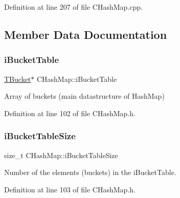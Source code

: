 Definition at line 207 of file C\+Hash\+Map.\+cpp.



\subsection{Member Data Documentation}
\mbox{\label{class_c_hash_map_a1018fdaad71e8207e747db26e88025d6}} 
\subsubsection{\texorpdfstring{i\+Bucket\+Table}{iBucketTable}}
{\footnotesize\ttfamily \hyperlink{struct_c_hash_map_1_1_t_bucket}{T\+Bucket}$\ast$ C\+Hash\+Map\+::i\+Bucket\+Table\hspace{0.3cm}{\ttfamily [private]}}



Array of buckets (main datastructure of Hash\+Map) 



Definition at line 102 of file C\+Hash\+Map.\+h.

\mbox{\label{class_c_hash_map_a8745c6aa08e235500828dea0ad30b548}} 
\subsubsection{\texorpdfstring{i\+Bucket\+Table\+Size}{iBucketTableSize}}
{\footnotesize\ttfamily size\+\_\+t C\+Hash\+Map\+::i\+Bucket\+Table\+Size\hspace{0.3cm}{\ttfamily [private]}}



Number of the elements (buckets) in the {\ttfamily i\+Bucket\+Table}. 



Definition at line 103 of file C\+Hash\+Map.\+h.

\mbox{\label{class_c_hash_map_ae2e5e0311dc9a20f5a93c53a2fbfe9a2}} 
